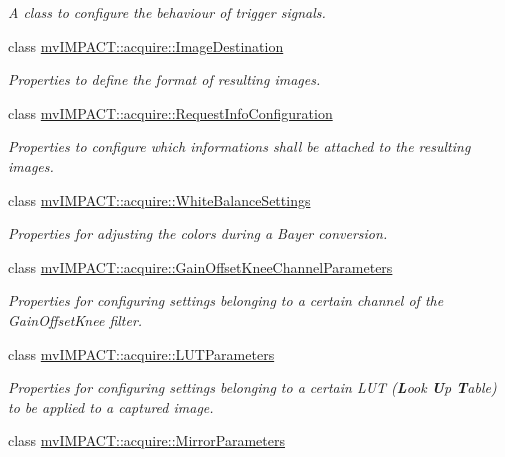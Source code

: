 \begin{DoxyCompactItemize}
\begin{DoxyCompactList}\small\item\em A class to configure the behaviour of trigger signals. \end{DoxyCompactList}\item 
class \hyperlink{classmv_i_m_p_a_c_t_1_1acquire_1_1_image_destination}{mv\+I\+M\+P\+A\+C\+T\+::acquire\+::\+Image\+Destination}
\begin{DoxyCompactList}\small\item\em Properties to define the format of resulting images. \end{DoxyCompactList}\item 
class \hyperlink{classmv_i_m_p_a_c_t_1_1acquire_1_1_request_info_configuration}{mv\+I\+M\+P\+A\+C\+T\+::acquire\+::\+Request\+Info\+Configuration}
\begin{DoxyCompactList}\small\item\em Properties to configure which informations shall be attached to the resulting images. \end{DoxyCompactList}\item 
class \hyperlink{classmv_i_m_p_a_c_t_1_1acquire_1_1_white_balance_settings}{mv\+I\+M\+P\+A\+C\+T\+::acquire\+::\+White\+Balance\+Settings}
\begin{DoxyCompactList}\small\item\em Properties for adjusting the colors during a Bayer conversion. \end{DoxyCompactList}\item 
class \hyperlink{classmv_i_m_p_a_c_t_1_1acquire_1_1_gain_offset_knee_channel_parameters}{mv\+I\+M\+P\+A\+C\+T\+::acquire\+::\+Gain\+Offset\+Knee\+Channel\+Parameters}
\begin{DoxyCompactList}\small\item\em Properties for configuring settings belonging to a certain channel of the Gain\+Offset\+Knee filter. \end{DoxyCompactList}\item 
class \hyperlink{classmv_i_m_p_a_c_t_1_1acquire_1_1_l_u_t_parameters}{mv\+I\+M\+P\+A\+C\+T\+::acquire\+::\+L\+U\+T\+Parameters}
\begin{DoxyCompactList}\small\item\em Properties for configuring settings belonging to a certain L\+U\+T ({\bfseries L}ook {\bfseries U}p {\bfseries T}able) to be applied to a captured image. \end{DoxyCompactList}\item 
class \hyperlink{classmv_i_m_p_a_c_t_1_1acquire_1_1_mirror_parameters}{mv\+I\+M\+P\+A\+C\+T\+::acquire\+::\+Mirror\+Parameters}

\end{DoxyCompactItemize}
